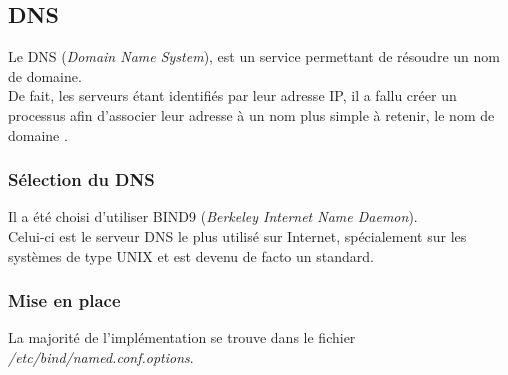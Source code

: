 \subsection{DNS}
\label{subsec:dns}

Le DNS (\emph{Domain Name System}), est un service permettant de résoudre un nom
de domaine. \\
De fait, les serveurs étant identifiés par leur adresse IP, il a fallu créer un
processus afin d'associer leur adresse à un nom plus simple à retenir, le \og
nom de domaine \fg.

\subsubsection{Sélection du DNS}
\label{subsubsec:selection-dns}

Il a été choisi d'utiliser BIND9 (\emph{Berkeley Internet Name Daemon}). \\
Celui-ci est le serveur DNS le plus utilisé sur Internet, spécialement sur les
systèmes de type UNIX et est devenu de facto un standard.

\subsubsection{Mise en place}
\label{subsubsec:miseen-place}

La majorité de l'implémentation se trouve dans le fichier
\textit{/etc/bind/named.conf.options}.


